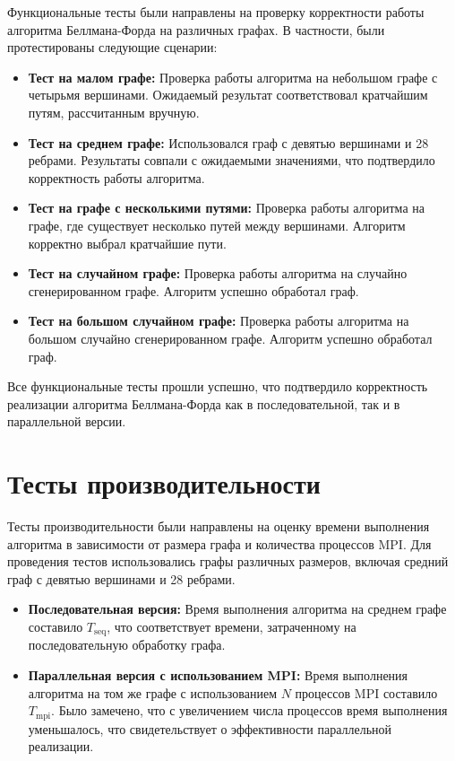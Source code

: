 \documentclass[12pt]{article}
\begin{document}
Функциональные тесты были направлены на проверку корректности работы алгоритма Беллмана-Форда на различных графах. В частности, были протестированы следующие сценарии:

\begin{itemize}
    \item \textbf{Тест на малом графе:} Проверка работы алгоритма на небольшом графе с четырьмя вершинами. Ожидаемый результат соответствовал кратчайшим путям, рассчитанным вручную.
    \item \textbf{Тест на среднем графе:} Использовался граф с девятью вершинами и 28 ребрами. Результаты совпали с ожидаемыми значениями, что подтвердило корректность работы алгоритма.
    \item \textbf{Тест на графе с несколькими путями:} Проверка работы алгоритма на графе, где существует несколько путей между вершинами. Алгоритм корректно выбрал кратчайшие пути.
    \item \textbf{Тест на случайном графе:} Проверка работы алгоритма на случайно сгенерированном графе. Алгоритм успешно обработал граф.
    \item \textbf{Тест на большом случайном графе:} Проверка работы алгоритма на большом случайно сгенерированном графе. Алгоритм успешно обработал граф.
\end{itemize}

Все функциональные тесты прошли успешно, что подтвердило корректность реализации алгоритма Беллмана-Форда как в последовательной, так и в параллельной версии.

\section*{Тесты производительности}

Тесты производительности были направлены на оценку времени выполнения алгоритма в зависимости от размера графа и количества процессов MPI. Для проведения тестов использовались графы различных размеров, включая средний граф с девятью вершинами и 28 ребрами.

\begin{itemize}
    \item \textbf{Последовательная версия:} Время выполнения алгоритма на среднем графе составило \( T_{\text{seq}} \), что соответствует времени, затраченному на последовательную обработку графа.
    \item \textbf{Параллельная версия с использованием MPI:} Время выполнения алгоритма на том же графе с использованием \( N \) процессов MPI составило \( T_{\text{mpi}} \). Было замечено, что с увеличением числа процессов время выполнения уменьшалось, что свидетельствует о эффективности параллельной реализации.
\end{itemize}
\end{document}
